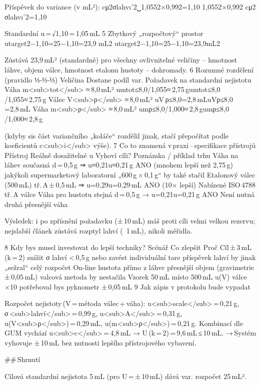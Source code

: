 {Příspěvek do variance (v mL²):
cμ2σlahvıˊ2⏟1,0552×0,992=1,10
1,0552×0,992
cμ2​σlahvıˊ2​​​=1,10

Standardní u = √1,10 = 1,05 mL
5  Zbytkový „rozpočtový“ prostor
utarget2−1,10=25−1,10=23,9  mL2
utarget2​−1,10=25−1,10=23,9mL2

Zůstává 23,9 mL² (standardně) pro všechny ovlivnitelné veličiny
– hmotnost láhve, objem válce, hmotnost etalonu hustoty – dohromady.
6  Rozumné rozdělení (pravidlo ⅓‑⅓‑⅓)
Veličina	Dostane podíl var.	Požadavek na standardní nejistotu
Váha m<sub>tot</sub>	≈ 8,0 mL²	umtot≤8,0/1,055≈ 2,75 gumtot​​≤8,0
​/1,055≈ 2,75 g
Válec V<sub>ρ</sub>	≈ 8,0 mL²	uV ⁣ρ≤8,0=2,8 mLuVρ​​≤8,0
​=2,8 mL
Váha m<sub>ρ</sub>	≈ 8,0 mL²	umρ≤8,0/1,000≈ 2,8 gumρ​​≤8,0
​/1,000≈ 2,8 g

(kdyby sis část variančního „koláče“ rozdělil jinak, stačí přepočítat podle koeficientů c<sub>i</sub> výše).
7  Co to znamená v praxi – specifikace přístrojů
Přístroj	Reálně dosažitelné u	Vyhoví cíli?	Poznámka / příklad trhu
Váha na láhev	současná d = 0,5 g ⇒ u≈0,21u≈0,21 g	ANO (mnohem lepší než 2,75 g)	jakýkoli supermarketový laboratorní „600 g × 0,1 g“ by také stačil
Etalonový válec (500 mL)	tř. A ± 0,5 mL ⇒ u=0,29u=0,29 mL	ANO (10× lepší)	Nabízené ISO 4788 tř. A válce
Váha pro hustotu	stejná d = 0,5 g → u=0,21u=0,21 g	ANO	Není nutná druhá přesnější váha

    Výsledek: i po zpřísnění požadavku (± 10 mL) máš proti cíli velmi velkou rezervu; nejslabší článek zůstává rozptyl lahví (~1 mL), nikoli měřidla.

8  Kdy bys musel investovat do lepší techniky?
Scénář	Co zlepšit	Proč
Cíl ± 3 mL (k = 2)	snížit σ lahví < 0,5 g nebo zavést individuální tare	příspěvek lahví by jinak „sežral“ celý rozpočet
On‑line hustota přímo z láhve	přesnější objem (gravimetrie ± 0,05 mL)	valcová metoda by nestačila
Vzorek 50 mL místo 500 mL	u(V) válce ×10	potřeboval bys pyknometr ± 0,05 mL
9  Jak zápis v protokolu bude vypadat

    Rozpočet nejistoty (V = métoda válec + váha):
    u<sub>scale</sub> = 0,21 g, σ <sub>lahví</sub> = 0,99 g, u<sub>A</sub> = 0,31 g, u(V<sub>ρ</sub>) = 0,29 mL, u(m<sub>ρ</sub>) = 0,21 g.
    Kombinací dle GUM vychází u<sub>c</sub> = 4,8 mL → U (k = 2) = 9,6 mL ≤ 10 mL.
    → Systém vyhovuje ± 10 mL bez nutnosti lepšího přístrojového vybavení.

## Shrnutí

    Cílová standardní nejistota 5 mL (pro U = ± 10 mL) dává var. rozpočet 25 mL².

}
